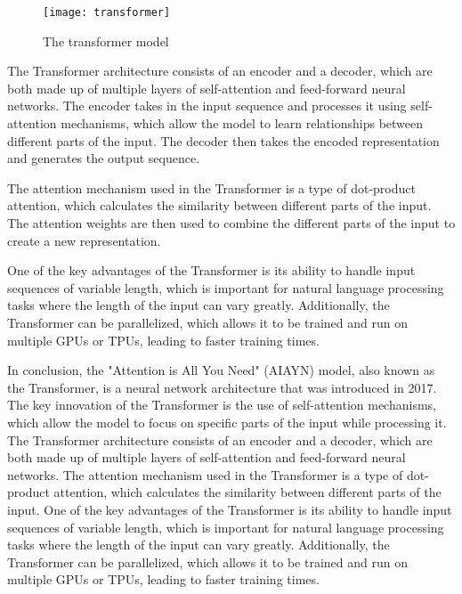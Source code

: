 \begin{figure}[H]
  \centering
  \texttt{[image: transformer]}
  \caption{The transformer model \cite{vaswani}}
\end{figure}

The Transformer architecture consists of an encoder and a decoder, which are both made up of multiple layers of self-attention and feed-forward neural networks.
The encoder takes in the input sequence and processes it using self-attention mechanisms, which allow the model to learn relationships between different parts of the input.
The decoder then takes the encoded representation and generates the output sequence.

The attention mechanism used in the Transformer is a type of dot-product attention, which calculates the similarity between different parts of the input.
The attention weights are then used to combine the different parts of the input to create a new representation.

One of the key advantages of the Transformer is its ability to handle input sequences of variable length, which is important for natural language processing tasks where the length of the input can vary greatly.
Additionally, the Transformer can be parallelized, which allows it to be trained and run on multiple GPUs or TPUs, leading to faster training times.

In conclusion, the "Attention is All You Need" (AIAYN) model, also known as the Transformer, is a neural network architecture that was introduced in 2017.
The key innovation of the Transformer is the use of self-attention mechanisms, which allow the model to focus on specific parts of the input while processing it.
The Transformer architecture consists of an encoder and a decoder, which are both made up of multiple layers of self-attention and feed-forward neural networks.
The attention mechanism used in the Transformer is a type of dot-product attention, which calculates the similarity between different parts of the input.
One of the key advantages of the Transformer is its ability to handle input sequences of variable length, which is important for natural language processing tasks where the length of the input can vary greatly. 
Additionally, the Transformer can be parallelized, which allows it to be trained and run on multiple GPUs or TPUs, leading to faster training times.

